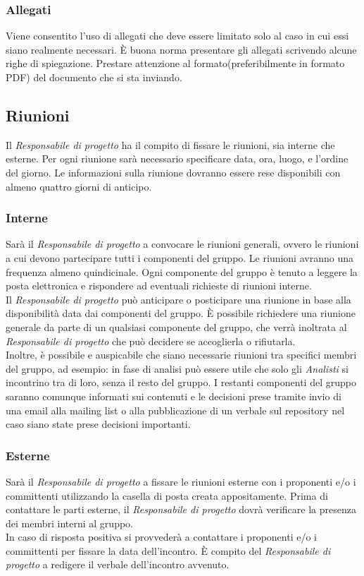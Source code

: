 		\subsubsection{Allegati}
Viene consentito l'uso di allegati che deve essere limitato solo al caso in cui essi siano realmente necessari. È buona norma presentare gli allegati scrivendo alcune righe di spiegazione. Prestare attenzione al formato(preferibilmente in formato PDF) del documento che si sta inviando. 

	\subsection{Riunioni}
Il \textit{Responsabile di progetto} ha il compito di fissare le riunioni, sia interne che esterne. Per ogni riunione sarà necessario specificare data, ora, luogo, e l'ordine del giorno. Le informazioni sulla riunione dovranno essere rese disponibili con almeno quattro giorni di anticipo.
		\subsubsection{Interne}
Sarà il \textit{Responsabile di progetto} a convocare le riunioni generali, ovvero le riunioni a cui devono partecipare tutti i componenti del gruppo. Le riunioni avranno una frequenza almeno quindicinale. Ogni componente del gruppo è tenuto a leggere la posta elettronica e rispondere ad eventuali richieste di riunioni interne. \\
Il \textit{Responsabile di progetto} può anticipare o posticipare una riunione in base alla disponibilità data dai componenti del gruppo. È possibile richiedere una riunione generale da parte di un qualsiasi componente del gruppo, che verrà inoltrata al \textit{Responsabile di progetto} che può decidere se accoglierla o rifiutarla.\\
Inoltre, è possibile e auspicabile che siano necessarie riunioni tra specifici membri del gruppo, ad esempio: in fase di analisi può essere utile che solo gli \textit{Analisti} si incontrino tra di loro, senza il resto del gruppo. I restanti componenti del gruppo saranno comunque informati sui contenuti e le decisioni prese tramite invio di una email alla mailing list o alla pubblicazione di un verbale sul repository nel caso siano state prese decisioni importanti.
		\subsubsection{Esterne}
Sarà il \textit{Responsabile di progetto} a fissare le riunioni esterne con i proponenti e/o i committenti utilizzando la casella di posta creata appositamente. Prima di contattare le parti esterne, il \textit{Responsabile di progetto} dovrà verificare la presenza dei membri interni al gruppo. \\
In caso di risposta positiva si provvederà a contattare i proponenti e/o i committenti per fissare la data dell'incontro.
È compito del \textit{Responsabile di progetto} a redigere il verbale dell'incontro avvenuto.

